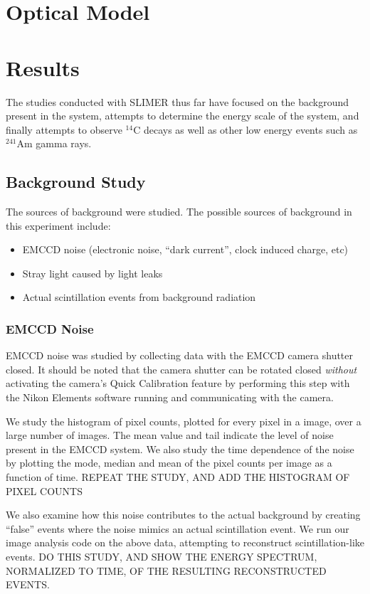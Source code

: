 \documentclass[11pt]{article}
\newcommand{\nuc}[2]{\ensuremath{^{#1}}#2}
\begin{document}
\section{Optical Model}



\section{Results}
The studies conducted with SLIMER thus far have focused on the background present in the system, attempts to determine the energy scale of the system, and finally attempts to observe \nuc{14}{C} decays as well as other low energy events such as \nuc{241}{Am} gamma rays. 

\subsection{Background Study}
The sources of background were studied. The possible sources of background in this experiment include:
\begin{itemize}
\item EMCCD noise (electronic noise, ``dark current'',  clock induced charge, etc)
\item Stray light caused by light leaks  
\item Actual scintillation events from background radiation
\end{itemize}
\subsubsection{EMCCD Noise}
EMCCD noise was studied by collecting data with the EMCCD camera shutter closed. It should be noted that the camera shutter can be rotated closed 	\emph{without} activating the camera's Quick Calibration feature by performing this step with the Nikon Elements software running and communicating with the camera.

We study the histogram of pixel counts, plotted for every pixel in a image, over a large number of images.
The mean value and tail indicate the level of noise present in the EMCCD system. We also study the time dependence of the noise by plotting the mode, median and mean of the pixel counts per image
as a function of time. REPEAT THE STUDY, AND ADD THE HISTOGRAM OF PIXEL COUNTS

We also examine how this noise contributes to the actual background by creating ``false'' events where the noise mimics an actual scintillation event. We run our image analysis code on the above data, attempting to reconstruct scintillation-like events. DO THIS STUDY, AND SHOW THE ENERGY SPECTRUM, NORMALIZED TO TIME, OF THE RESULTING RECONSTRUCTED EVENTS.
\end{document}
